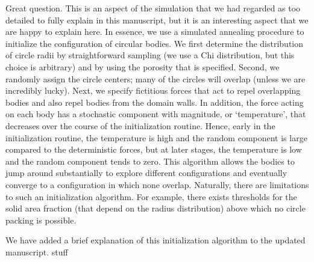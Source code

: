 \documentclass[11pt]{article}
\begin{document}
Great question. This is an aspect of the simulation that we had regarded as too detailed to fully explain in this manuscript, but it is an interesting aspect that we are happy to explain here. In essence, we use a simulated annealing procedure to initialize the configuration of circular bodies. We first determine the distribution of circle radii by straightforward sampling (we use a Chi distribution, but this choice is arbitrary) and by using the porosity that is specified. Second, we randomly assign the circle centers; many of the circles will overlap (unless we are incredibly lucky). Next, we specify fictitious forces that act to repel overlapping bodies and also repel bodies from the domain walls. In addition, the force acting on each body has a stochastic component with magnitude, or `temperature', that decreases over the course of the initialization routine. Hence, early in the initialization routine, the temperature is high and the random component is large compared to the deterministic forces, but at later stages, the temperature is low and the random component tends to zero. This algorithm allows the bodies to jump around substantially to explore different configurations and eventually converge to a configuration in which none overlap. Naturally, there are limitations to such an initialization algorithm. For example, there exists thresholds for the solid area fraction (that depend on the radius distribution) above which no circle packing is possible.

We have added a brief explanation of this initialization algorithm to the updated manuscript. stuff
\end{document}
